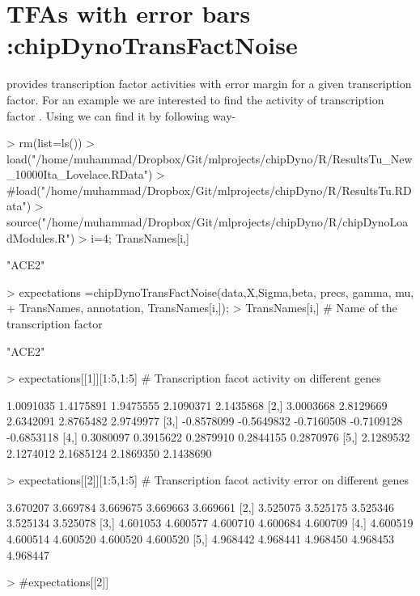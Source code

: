 \documentclass{article}
\begin{document}
\section{TFAs with error bars :chipDynoTransFactNoise}
 provides transcription factor activities with error margin for a given transcription factor. For an example we are interested to find the activity of transcription factor . Using  we can find it by following way-


\begin{Schunk}
\begin{Sinput}
> rm(list=ls())
> load("/home/muhammad/Dropbox/Git/mlprojects/chipDyno/R/ResultsTu_New_10000Ita_Lovelace.RData")
> #load("/home/muhammad/Dropbox/Git/mlprojects/chipDyno/R/ResultsTu.RData")
> source("/home/muhammad/Dropbox/Git/mlprojects/chipDyno/R/chipDynoLoadModules.R")
> i=4; TransNames[i,]
\end{Sinput}
\begin{Soutput}
[1] "ACE2"
\end{Soutput}
\begin{Sinput}
> expectations =chipDynoTransFactNoise(data,X,Sigma,beta, precs, gamma, mu,
+                                      TransNames, annotation, TransNames[i,]);
> TransNames[i,] # Name of the transcription factor
\end{Sinput}
\begin{Soutput}
[1] "ACE2"
\end{Soutput}
\begin{Sinput}
> expectations[[1]][1:5,1:5] # Transcription facot activity on different genes
\end{Sinput}
\begin{Soutput}
           [,1]       [,2]       [,3]       [,4]       [,5]
[1,]  1.0091035  1.4175891  1.9475555  2.1090371  2.1435868
[2,]  3.0003668  2.8129669  2.6342091  2.8765482  2.9749977
[3,] -0.8578099 -0.5649832 -0.7160508 -0.7109128 -0.6853118
[4,]  0.3080097  0.3915622  0.2879910  0.2844155  0.2870976
[5,]  2.1289532  2.1274012  2.1685124  2.1869350  2.1438690
\end{Soutput}
\begin{Sinput}
> expectations[[2]][1:5,1:5] # Transcription facot activity error on different genes
\end{Sinput}
\begin{Soutput}
         [,1]     [,2]     [,3]     [,4]     [,5]
[1,] 3.670207 3.669784 3.669675 3.669663 3.669661
[2,] 3.525075 3.525175 3.525346 3.525134 3.525078
[3,] 4.601053 4.600577 4.600710 4.600684 4.600709
[4,] 4.600519 4.600514 4.600520 4.600520 4.600520
[5,] 4.968442 4.968441 4.968450 4.968453 4.968447
\end{Soutput}
\begin{Sinput}
> #expectations[[2]]
\end{Sinput}
\end{Schunk}
\end{document}
